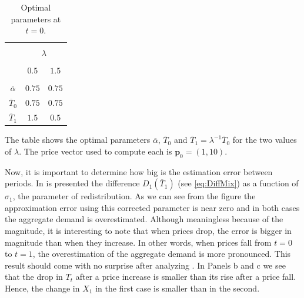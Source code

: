 \documentclass[english, a4paper, 12pt]{article}
\begin{document}
	\begin{table}[H]
		\centering
		\caption{Optimal parameters at $t = 0$.}
		\label{tab:OptimalAlphaT}
		\centering
		\begin{tabular}{ccc}
		\hline\hline
														\\[-2ex]
							&	\multicolumn{2}{c}{$\lambda$}	\\\cline{2-3}
														\\[-2ex]
							&	$0.5$		&	$1.5$	\\ \hline
														\\[-2ex]
			$\overline{\alpha}$	&	$0.75$		&	$0.75$	\\[1ex]
			$\overline{T}_{0}$	&	$0.75$		&	$0.75$	\\[1ex]
			$\overline{T}_{1}$	&	$1.5$		&	$0.5$	\\[.5ex]
		\hline\hline
		\end{tabular} \vspace{2ex}
	
		\begin{minipage}{.6\textwidth} \scriptsize
			The table shows the optimal parameters $\overline{\alpha}$, $\overline{T}_{0}$ and $\overline{T}_{1} = \lambda^{-1} \overline{T}_{0}$ for the two values of $\lambda$. The price vector used to compute each is $\mathbf{p}_{0} = (1,10)$.
		\end{minipage}
	\end{table}
Now, it is important to determine how big is the estimation error between periods. In  is presented the difference $D_{1}(\overline{T}_{1})$ (see \eqref{eq:DiffMix}) as a function of $\sigma_{1}$, the parameter of redistribution. As we can see from the figure the approximation error using this corrected parameter is near zero and in both cases the aggregate demand is overestimated. Although meaningless because of the magnitude, it is interesting to note that when prices drop, the error is bigger in magnitude than when they increase. In other words, when prices fall from $t=0$ to $t = 1$, the overestimation of the aggregate demand is more pronounced. This result should come with no surprise after analyzing . In Panels b and c we see that the drop in $T_{t}$ after a price increase is smaller than its rise after a price fall. Hence, the change in $X_{1}$ in the first case is smaller than in the second. 
\end{document}
